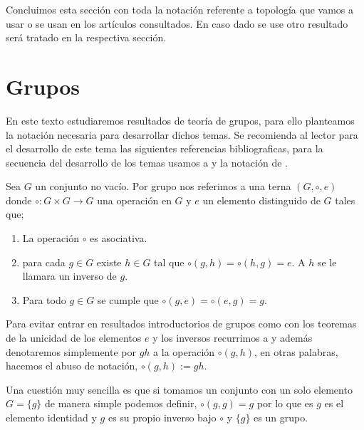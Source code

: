 Concluimos esta sección con toda la notación referente a topología que vamos a usar o se usan en los artículos consultados. En caso dado se use otro resultado será tratado en la respectiva sección. 


\section{Grupos}
En este texto estudiaremos resultados de teoría de grupos, para ello planteamos la notación necesaria para desarrollar dichos temas. Se recomienda al lector para el desarrollo de este tema las siguientes referencias bibliograficas, para la secuencia del desarrollo de los temas usamos a \cite{alg_grove} y la notación de \cite{alg_ii}.

\begin{df}
Sea $G$ un conjunto no vacío. Por grupo nos referimos a una terna $(G, \circ, e)$ donde $\circ:G \times G \to G$ una operación en $G$ y $e$ un elemento distinguido de $G$ tales que;

\begin{enumerate}
	\item La operación $\circ$ es asociativa.
	
	\item para cada $g \in G$ existe $h \in G$ tal que $ \circ (g,h)= \circ(h ,g)=e$. A $h$ se le llamara un inverso de $g$. 
	
	\item Para todo $g \in G$ se cumple que $\circ(g ,e) =  \circ(e,g) = g.$
\end{enumerate}
\end{df}

\begin{cn}
Para evitar entrar en resultados introductorios de grupos como con los teoremas de la unicidad de los elementos $e$ y los inversos recurrimos a \cite{alg_grove} y además  denotaremos simplemente por $gh$ a la operación $\circ(g,h)$, en otras palabras, hacemos el abuso de notación,  $\circ(g,h):=gh.$
\end{cn}

Una cuestión muy sencilla es que si tomamos un conjunto con un solo elemento $G=\{g\}$ de manera simple podemos definir, $\circ(g,g)=g$ por lo que es $g$ es el elemento identidad y $g$ es su propio inverso bajo $\circ$ y $\{g\}$ es un grupo. 

